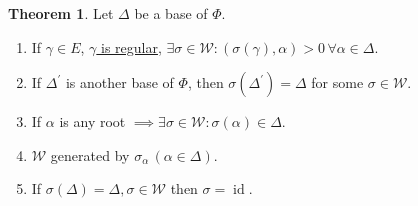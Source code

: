 \documentclass{article}
\theoremstyle{definition}
\newtheorem{theorem}{Theorem}[section]
\begin{document}
\begin{theorem}
    Let \(\Delta\) be a base of \(\Phi\).

    \begin{enumerate}[label=\alph*)]
        \item If \(\gamma \in E\), \underline{\(\gamma\) is regular}, \(\exists \sigma \in \mathcal{W} : (\sigma(\gamma), \alpha) > 0 \, \forall \alpha \in \Delta\).
        \item If \(\Delta^{\prime}\) is another base of \(\Phi\), then \(\sigma(\Delta^{\prime}) = \Delta\) for some \(\sigma\in \mathcal{W}\).
        \item If \(\alpha\) is any root \(\implies \exists \sigma \in \mathcal{W} : \sigma(\alpha)\in \Delta\).
        \item \(\mathcal{W}\) generated by \(\sigma_\alpha \,(\alpha\in \Delta)\).
        \item If \(\sigma(\Delta)=\Delta, \sigma \in \mathcal{W}\) then \(\sigma = \operatorname{id}\). 
    \end{enumerate} 
\end{theorem}
\end{document}
